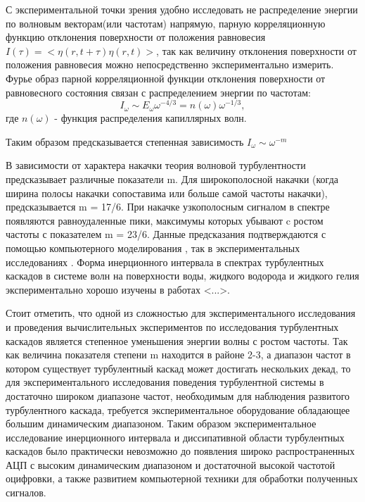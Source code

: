 С экспериментальной точки зрения удобно исследовать не распределение энергии по волновым векторам(или частотам) напрямую, парную корреляционную функцию отклонения поверхности от положения равновесия $I(\tau)=<\eta(r, t+\tau)\eta(r,t)>$, так как величину отклонения поверхности от положения равновесия можно непосредственно экспериментально измерить. Фурье образ парной корреляционной функции отклонения поверхности от равновесного состояния связан с распределением энергии по частотам:
\begin{equation}
\label{eq:EOmegaI}
I_\omega \sim E_\omega \omega^{-4/3} = n(\omega) \omega^{-1/3},
\end{equation}
где $n(\omega)$ - функция распределения капиллярных волн.

Таким образом предсказывается степенная зависимость $I_\omega \sim \omega^{-m}$

В зависимости от характера накачки теория волновой турбулентности предсказывает различные показатели m. Для широкополосной накачки (когда ширина полосы накачки сопоставима или больше самой частоты накачки), предсказывается m = 17/6. При накачке узкополосным сигналом в спектре появляются равноудаленные пики, максимумы которых убывают c ростом частоты с показателем m = 23/6. Данные предсказания подтверждаются с помощью компьютерного моделирования \todo{[ссылки]}, так в экспериментальных исследованиях \cite{Brazhnikov_liq_hydr, Falcon2007}. Форма инерционного интервала в спектрах турбулентных каскадов в системе волн на поверхности воды, жидкого водорода и жидкого гелия экспериментально хорошо изучены в работах <...>. 

Стоит отметить, что одной из сложностью для экспериментального исследования и проведения вычислительных экспериментов по исследования турбулентных каскадов является степенное уменьшения энергии волны с ростом частоты. Так как величина показателя степени m находится в районе 2-3, а диапазон частот в котором существует турбулентный каскад может достигать нескольких декад, то для экспериментального исследования поведения турбулентной системы в достаточно широком диапазоне частот, необходимым для наблюдения развитого турбулентного каскада, требуется экспериментальное оборудование обладающее большим динамическим диапазоном. Таким образом экспериментальное исследование инерционного интервала и диссипативной области турбулентных каскадов было практически невозможно до появления широко распространенных АЦП с высоким динамическим диапазоном и достаточной высокой частотой оцифровки, а также развитием компьютерной техники для обработки полученных сигналов.

